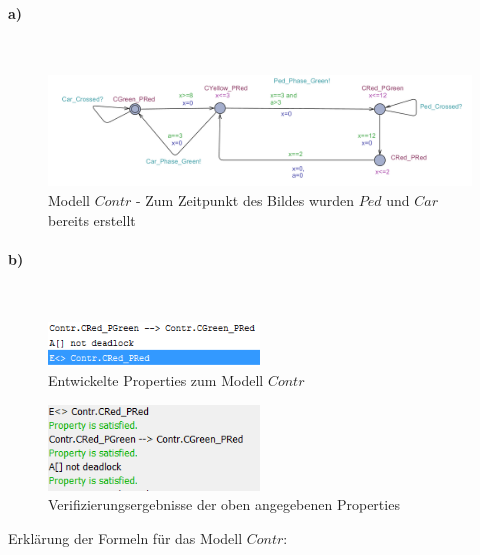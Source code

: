 
\paragraph{a)}\mbox{} \\

\begin{figure}[H] 
	\centering 
	\includegraphics[width=\textwidth]{./UPAAAL_Screens/Contr1}
	\caption[Aufgabe 2a)]{Modell $Contr$ - Zum Zeitpunkt des Bildes wurden $Ped$ und $Car$ bereits erstellt}    
\end{figure}

\paragraph{b)}\mbox{} \\


\begin{figure}[H] 
	\centering 
	\includegraphics[width=0.5\textwidth]{./UPAAAL_Screens/2b_Verify}
	\caption[Aufgabe 2b)]{Entwickelte Properties zum Modell $Contr$}    
\end{figure}

\begin{figure}[H] 
	\centering 
	\includegraphics[width=0.5\textwidth]{./UPAAAL_Screens/2b_Ergebnisse}
	\caption[Aufgabe 2b)]{Verifizierungsergebnisse der oben angegebenen Properties}    
\end{figure}

Erklärung der Formeln für das Modell $Contr$:

